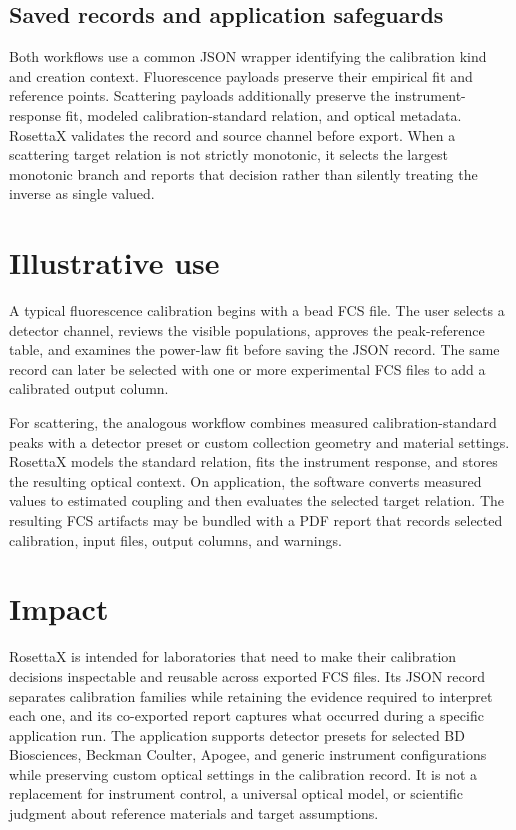 \documentclass[preprint,12pt]{elsarticle}
\begin{document}
\subsection{Saved records and application safeguards}

Both workflows use a common JSON wrapper identifying the calibration kind and
creation context. Fluorescence payloads preserve their empirical fit and
reference points. Scattering payloads additionally preserve the
instrument-response fit, modeled calibration-standard relation, and optical
metadata. RosettaX validates the record and source channel before export.
When a scattering target relation is not strictly monotonic, it selects the
largest monotonic branch and reports that decision rather than silently treating
the inverse as single valued.

\section{Illustrative use}

A typical fluorescence calibration begins with a bead FCS file. The user
selects a detector channel, reviews the visible populations, approves the
peak-reference table, and examines the power-law fit before saving the JSON
record. The same record can later be selected with one or more experimental
FCS files to add a calibrated output column.

For scattering, the analogous workflow combines measured calibration-standard
peaks with a detector preset or custom collection geometry and material
settings. RosettaX models the standard relation, fits the instrument response,
and stores the resulting optical context. On application, the software
converts measured values to estimated coupling and then evaluates the selected
target relation. The resulting FCS artifacts may be bundled with a PDF report
that records selected calibration, input files, output columns, and warnings.

\section{Impact}

RosettaX is intended for laboratories that need to make their calibration
decisions inspectable and reusable across exported FCS files. Its JSON record
separates calibration families while retaining the evidence required to
interpret each one, and its co-exported report captures what occurred during a
specific application run. The application supports detector presets for
selected BD Biosciences, Beckman Coulter, Apogee, and generic instrument
configurations while preserving custom optical settings in the calibration
record. It is not a replacement for instrument control, a universal optical
model, or scientific judgment about reference materials and target assumptions.
\end{document}
